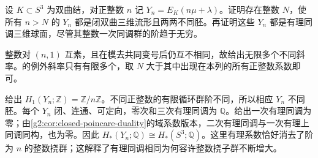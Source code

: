 \begin{exercise}\label{g2:ex:infinitely-many-hyperbolic-fillings}
	设 \(K\subset S^3\) 为双曲结，对正整数 \(n\) 记 \(Y_n=E_K(n\mu+\lambda)\)。证明存在整数 \(N\)，使所有 \(n>N\) 的 \(Y_n\) 都是闭双曲三维流形且两两不同胚。再证明这些 \(Y_n\) 都是有理同调三维球面，尽管其整数一次同调群的阶趋于无穷。
\end{exercise}
\begin{solution}
	整数对 \((n,1)\) 互素，且在模去共同变号后仍互不相同，故给出无限多个不同斜率。的例外斜率只有有限多个，取 \(N\) 大于其中出现在本列的所有正整数系数即可。

	给出 \(H_1(Y_n;\mathbb Z)=\mathbb Z/n\mathbb Z\)。不同正整数的有限循环群阶不同，所以相应 \(Y_n\) 不同胚。每个 \(Y_n\) 闭、连通、可定向，零次和三次有理同调为 \(\mathbb Q\)。给出一次有理同调为零；由\cref{g2:cor:closed-poincare-duality}的域系数版本，二次有理同调与一次有理上同调同构，也为零。因此 \(H_*(Y_n;\mathbb Q)\cong H_*(S^3;\mathbb Q)\)。这里有理系数恰好消去了阶为 \(n\) 的整数挠群；这解释了有理同调相同为何容许整数挠子群不断增大。
\end{solution}
